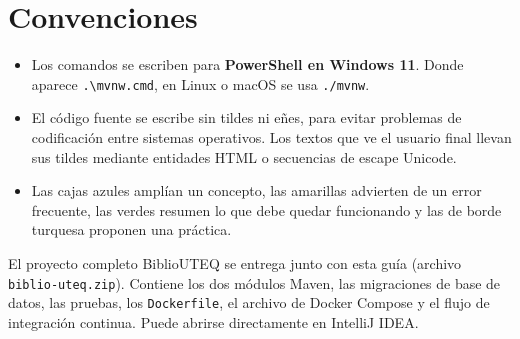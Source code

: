 \section*{Convenciones}

\begin{itemize}
	\item Los comandos se escriben para \textbf{PowerShell en Windows 11}. Donde aparece \texttt{.\textbackslash mvnw.cmd}, en Linux o macOS se usa \texttt{./mvnw}.
	\item El código fuente se escribe sin tildes ni eñes, para evitar problemas de codificación entre sistemas operativos. Los textos que ve el usuario final llevan sus tildes mediante entidades HTML o secuencias de escape Unicode.
	\item Las cajas azules amplían un concepto, las amarillas advierten de un error frecuente, las verdes resumen lo que debe quedar funcionando y las de borde turquesa proponen una práctica.
\end{itemize}

\begin{infoBox}[title={Material que acompaña a la guía}]
	El proyecto completo BiblioUTEQ se entrega junto con esta guía (archivo \texttt{biblio-uteq.zip}). Contiene los dos módulos Maven, las migraciones de base de datos, las pruebas, los \texttt{Dockerfile}, el archivo de Docker Compose y el flujo de integración continua. Puede abrirse directamente en IntelliJ IDEA.
\end{infoBox}
